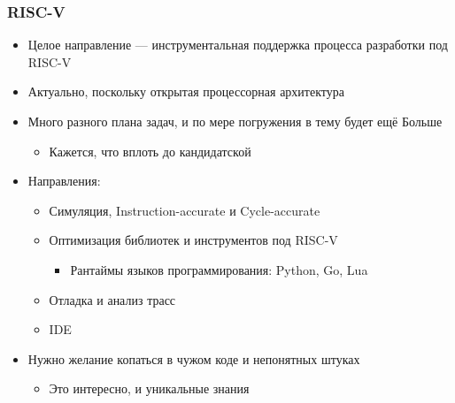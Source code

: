 \documentclass{slides-style}
\begin{document}
    \begin{frame}
        \frametitle{RISC-V}
        \begin{itemize}
            \item Целое направление --- инструментальная поддержка процесса разработки под RISC-V
            \item Актуально, поскольку открытая процессорная архитектура
            \item Много разного плана задач, и по мере погружения в тему будет ещё Больше
            \begin{itemize}
                \item Кажется, что вплоть до кандидатской
            \end{itemize}
            \item Направления:
            \begin{itemize}
                \item Симуляция, Instruction-accurate и Cycle-accurate
                \item Оптимизация библиотек и инструментов под RISC-V
                \begin{itemize}
                    \item Рантаймы языков программирования: Python, Go, Lua
                \end{itemize}
                \item Отладка и анализ трасс
                \item IDE
            \end{itemize}
            \item Нужно желание копаться в чужом коде и непонятных штуках
            \begin{itemize}
                \item Это интересно, и уникальные знания
            \end{itemize}
        \end{itemize}
    \end{frame}
\end{document}
